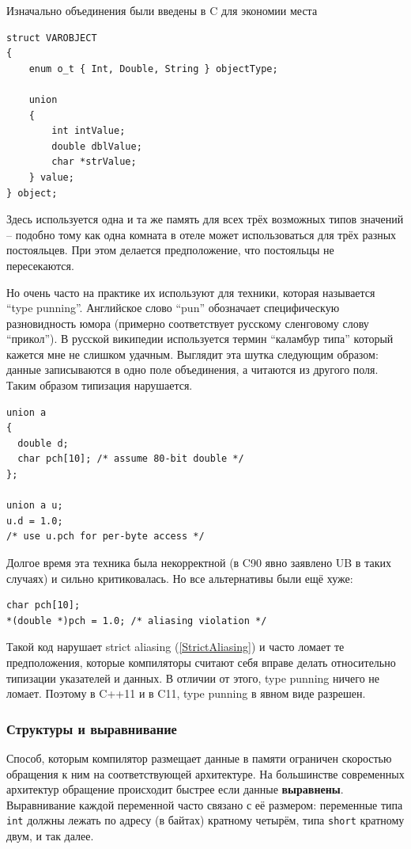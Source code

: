 \documentclass[a4paper,12pt,oneside]{article}
\begin{document}
Изначально объединения были введены в C для экономии места

\begin{lstlisting}
struct VAROBJECT
{
    enum o_t { Int, Double, String } objectType;

    union
    {
        int intValue;
        double dblValue;
        char *strValue;
    } value;
} object;
\end{lstlisting}

Здесь используется одна и та же память для всех трёх возможных типов значений -- подобно тому как одна комната в отеле может использоваться для трёх разных постояльцев. При этом делается предположение, что постояльцы не пересекаются.

Но очень часто на практике их используют для техники, которая называется ``type punning''. Английское слово ``pun'' обозначает специфическую разновидность юмора (примерно соответствует русскому сленговому слову ``прикол''). В русской википедии используется термин ``каламбур типа'' который кажется мне не слишком удачным. Выглядит эта шутка следующим образом: данные записываются в одно поле объединения, а читаются из другого поля. Таким образом типизация нарушается.

\begin{lstlisting}
union a
{
  double d;
  char pch[10]; /* assume 80-bit double */
};

union a u;
u.d = 1.0;
/* use u.pch for per-byte access */
\end{lstlisting}

Долгое время эта техника была некорректной (в C90 явно заявлено UB в таких случаях) и сильно критиковалась. Но все альтернативы были ещё хуже:

\begin{lstlisting}
char pch[10];
*(double *)pch = 1.0; /* aliasing violation */
\end{lstlisting}

Такой код нарушает strict aliasing (\ref{StrictAliasing}) и часто ломает те предположения, которые компиляторы считают себя вправе делать относительно типизации указателей и данных. В отличии от этого, type punning ничего не ломает. Поэтому в C++11 и в C11, type punning в явном виде разрешен.

\subsubsection{Структуры и выравнивание}

Способ, которым компилятор размещает данные в памяти ограничен скоростью обращения к ним на соответствующей архитектуре. На большинстве современных архитектур обращение происходит быстрее если данные \textbf{выравнены}. Выравнивание каждой переменной часто связано с её размером: переменные типа \lstinline!int! должны лежать по адресу (в байтах) кратному четырём, типа \lstinline!short! кратному двум, и так далее.
\end{document}
